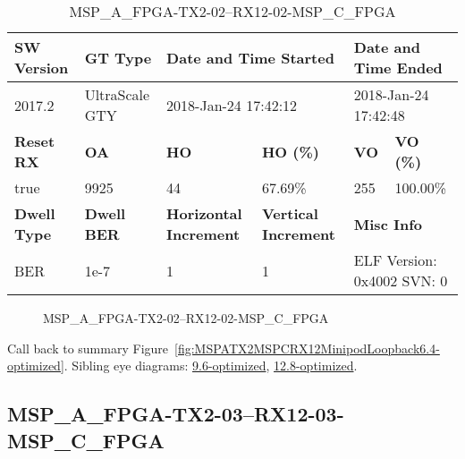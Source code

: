 \begin{table}[h]
\centering
\caption{MSP\_A\_FPGA-TX2-02--RX12-02-MSP\_C\_FPGA}
\label{tab:MSPAFPGATX202RX1202MSPCFPGA6.4-optimized}
\begin{tabular}{@{}|l|l|l|l|l|l|@{}}
\toprule
\textbf{SW Version}                & \textbf{GT Type}   & \multicolumn{2}{l|}{\textbf{Date and Time Started}}            & \multicolumn{2}{l|}{\textbf{Date and Time Ended}}        \\ \midrule
2017.2                       & UltraScale GTY          & \multicolumn{2}{l|}{2018-Jan-24 17:42:12}                   & \multicolumn{2}{l|}{2018-Jan-24 17:42:48}               \\ \midrule
\textbf{Reset RX}                  & \textbf{OA} & \textbf{HO}   & \textbf{HO (\%)} & \textbf{VO} & \textbf{VO (\%)} \\ \midrule
true & 9925        & 44          & 67.69\%        & 255        & 100.00\%       \\ \midrule
\textbf{Dwell Type}                & \textbf{Dwell BER} & \textbf{Horizontal Increment} & \textbf{Vertical Increment}    & \multicolumn{2}{l|}{\textbf{Misc Info}}                  \\ \midrule
BER                            & 1e-7        & 1        & 1           & \multicolumn{2}{l|}{ELF Version: 0x4002 SVN: 0}                         \\ \bottomrule
\end{tabular}
\end{table}

\begin{figure}[h]
\caption{MSP\_A\_FPGA-TX2-02--RX12-02-MSP\_C\_FPGA} \label{fig:MSPAFPGATX202RX1202MSPCFPGA6.4-optimized}
\end{figure}

Call back to summary Figure~\ref{fig:MSPATX2MSPCRX12MinipodLoopback6.4-optimized}.
Sibling eye diagrams: \hyperref[sec:MSPAFPGATX202RX1202MSPCFPGA9.6-optimized]{9.6-optimized}, \hyperref[sec:MSPAFPGATX202RX1202MSPCFPGA12.8-optimized]{12.8-optimized}.

\clearpage
\newpage


\subsection{MSP\_A\_FPGA-TX2-03--RX12-03-MSP\_C\_FPGA}\label{sec:MSPAFPGATX203RX1203MSPCFPGA6.4-optimized}

